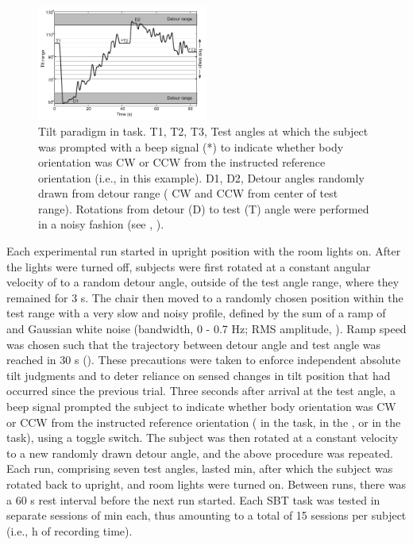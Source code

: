 \begin{figure}    
    \includegraphics[width=0.5\textwidth]{src/paper1/figure2.pdf}
    
    \caption{Tilt paradigm in  task. T1, T2, T3, Test angles at which the subject was prompted with a beep signal (*) to indicate whether body orientation was CW or CCW from the instructed reference orientation (i.e.,  in this example). D1, D2, Detour angles randomly drawn from detour range ( CW and CCW from center of test range). Rotations from detour (D) to test (T) angle were performed in a noisy fashion (see , ).}
    \label{p1:fig2}
\end{figure}

Each experimental run started in upright position with the room lights on. After the lights were turned off, subjects were first rotated at a constant angular velocity of  to a random detour angle, outside of the test angle range, where they remained for 3 s. The chair then moved to a randomly chosen position within the test range with a very slow and noisy profile, defined by the sum of a ramp of  and Gaussian white noise (bandwidth, 0 - 0.7 Hz; RMS amplitude, ). Ramp speed was chosen such that the trajectory between detour angle and test angle was reached in 30 \si{\second} (). These precautions were taken to enforce independent absolute tilt judgments and to deter reliance on sensed changes in tilt position that had occurred since the previous trial. Three seconds after arrival at the test angle, a beep signal prompted the subject to indicate whether body orientation was CW or CCW from the instructed reference orientation ( in the  task,  in the , or  in the  task), using a toggle switch. The subject was then rotated at a constant velocity to a new randomly drawn detour angle, and the above procedure was repeated. Each run, comprising seven test angles, lasted  min, after which the subject was rotated back to upright, and room lights were turned on. Between runs, there was a 60 s rest interval before the next run started. Each SBT task was tested in separate sessions of  min each, thus amounting to a total of 15 sessions per subject (i.e.,  h of recording time).

